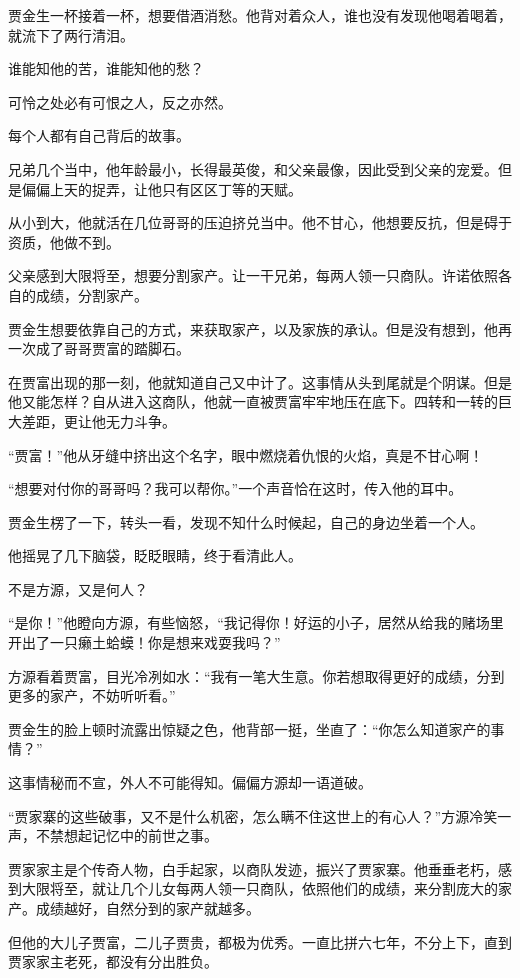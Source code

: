 \begin{this_body}
贾金生一杯接着一杯，想要借酒消愁。他背对着众人，谁也没有发现他喝着喝着，就流下了两行清泪。

谁能知他的苦，谁能知他的愁？

可怜之处必有可恨之人，反之亦然。

每个人都有自己背后的故事。

兄弟几个当中，他年龄最小，长得最英俊，和父亲最像，因此受到父亲的宠爱。但是偏偏上天的捉弄，让他只有区区丁等的天赋。

从小到大，他就活在几位哥哥的压迫挤兑当中。他不甘心，他想要反抗，但是碍于资质，他做不到。

父亲感到大限将至，想要分割家产。让一干兄弟，每两人领一只商队。许诺依照各自的成绩，分割家产。

贾金生想要依靠自己的方式，来获取家产，以及家族的承认。但是没有想到，他再一次成了哥哥贾富的踏脚石。

在贾富出现的那一刻，他就知道自己又中计了。这事情从头到尾就是个阴谋。但是他又能怎样？自从进入这商队，他就一直被贾富牢牢地压在底下。四转和一转的巨大差距，更让他无力斗争。

“贾富！”他从牙缝中挤出这个名字，眼中燃烧着仇恨的火焰，真是不甘心啊！

“想要对付你的哥哥吗？我可以帮你。”一个声音恰在这时，传入他的耳中。

贾金生楞了一下，转头一看，发现不知什么时候起，自己的身边坐着一个人。

他摇晃了几下脑袋，眨眨眼睛，终于看清此人。

不是方源，又是何人？

“是你！”他瞪向方源，有些恼怒，“我记得你！好运的小子，居然从给我的赌场里开出了一只癞土蛤蟆！你是想来戏耍我吗？”

方源看着贾富，目光冷冽如水：“我有一笔大生意。你若想取得更好的成绩，分到更多的家产，不妨听听看。”

贾金生的脸上顿时流露出惊疑之色，他背部一挺，坐直了：“你怎么知道家产的事情？”

这事情秘而不宣，外人不可能得知。偏偏方源却一语道破。

“贾家寨的这些破事，又不是什么机密，怎么瞒不住这世上的有心人？”方源冷笑一声，不禁想起记忆中的前世之事。

贾家家主是个传奇人物，白手起家，以商队发迹，振兴了贾家寨。他垂垂老朽，感到大限将至，就让几个儿女每两人领一只商队，依照他们的成绩，来分割庞大的家产。成绩越好，自然分到的家产就越多。

但他的大儿子贾富，二儿子贾贵，都极为优秀。一直比拼六七年，不分上下，直到贾家家主老死，都没有分出胜负。


\end{this_body}
